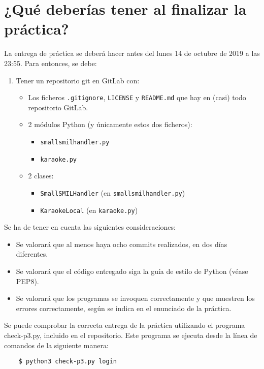 \documentclass[11pt,a4paper]{article}
\begin{document}
\section{¿Qué deberías tener al finalizar la práctica?}

La entrega de práctica se deberá hacer antes del lunes 14 de octubre de 2019 a las 23:55. Para entonces, se debe: 

\begin{enumerate}
  \item Tener un repositorio git en GitLab con:
  \begin{itemize}
    \item Los ficheros \texttt{.gitignore}, \texttt{LICENSE} y \texttt{README.md} que hay en (casi) todo repositorio GitLab.
    \item 2 módulos Python (y únicamente estos dos ficheros):
    \begin{itemize}
      \item \texttt{smallsmilhandler.py}
      \item \texttt{karaoke.py}
    \end{itemize}
    \item 2 clases:
    \begin{itemize}
      \item \texttt{SmallSMILHandler} (en \texttt{smallsmilhandler.py})
      \item \texttt{KaraokeLocal} (en \texttt{karaoke.py})
    \end{itemize}
  \end{itemize}
\end{enumerate}

Se ha de tener en cuenta las siguientes consideraciones:
\begin{itemize}
  \item Se valorará que al menos haya ocho commits realizados, en dos días diferentes.
  \item Se valorará que el código entregado siga la guía de estilo de Python (véase PEP8).
  \item Se valorará que los programas se invoquen correctamente y que muestren los errores correctamente, según se indica en el enunciado de la práctica.
\end{itemize}

Se puede comprobar la correcta entrega de la práctica utilizando el programa check-p3.py, incluido en el repositorio. Este programa se ejecuta desde la línea de comandos de la siguiente manera:
\begin{verbatim}
	$ python3 check-p3.py login
\end{verbatim}
\end{document}
